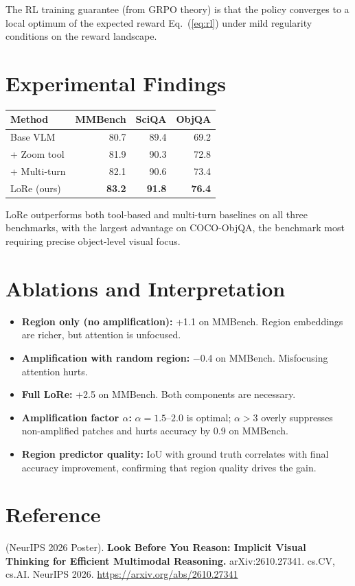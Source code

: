 \documentclass[10pt,twocolumn]{article}
\begin{document}
The RL training guarantee (from GRPO theory) is that the policy converges to a local optimum of the expected reward Eq.~(\ref{eq:rl}) under mild regularity conditions on the reward landscape.

\section{Experimental Findings}

\begin{center}
\small
\begin{tabular}{lrrr}
\toprule
\textbf{Method} & \textbf{MMBench} & \textbf{SciQA} & \textbf{ObjQA} \\
\midrule
Base VLM & 80.7 & 89.4 & 69.2 \\
+ Zoom tool & 81.9 & 90.3 & 72.8 \\
+ Multi-turn & 82.1 & 90.6 & 73.4 \\
LoRe (ours) & \textbf{83.2} & \textbf{91.8} & \textbf{76.4} \\
\bottomrule
\end{tabular}
\end{center}

LoRe outperforms both tool-based and multi-turn baselines on all three benchmarks, with the largest advantage on COCO-ObjQA, the benchmark most requiring precise object-level visual focus.

\section{Ablations and Interpretation}

\begin{itemize}[leftmargin=1em,itemsep=2pt]
  \item \textbf{Region only (no amplification):} +1.1 on MMBench. Region embeddings are richer, but attention is unfocused.
  \item \textbf{Amplification with random region:} $-$0.4 on MMBench. Misfocusing attention hurts.
  \item \textbf{Full LoRe:} +2.5 on MMBench.  Both components are necessary.
  \item \textbf{Amplification factor $\alpha$:} $\alpha=1.5$--$2.0$ is optimal; $\alpha > 3$ overly suppresses non-amplified patches and hurts accuracy by 0.9 on MMBench.
  \item \textbf{Region predictor quality:} IoU with ground truth correlates with final accuracy improvement, confirming that region quality drives the gain.
\end{itemize}

\section*{Reference}
(NeurIPS 2026 Poster).
\textbf{Look Before You Reason: Implicit Visual Thinking for Efficient Multimodal Reasoning.}
arXiv:2610.27341. cs.CV, cs.AI. NeurIPS 2026.
\url{https://arxiv.org/abs/2610.27341}
\end{document}
